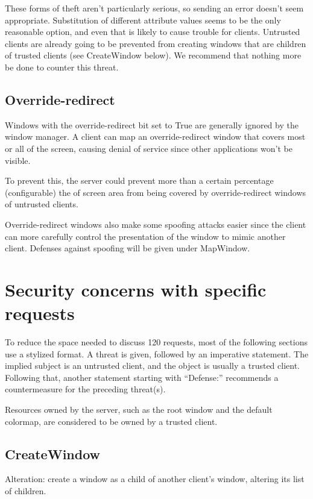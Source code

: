 \documentclass{article}
\begin{document}
These forms of theft aren't particularly serious, so sending an error
doesn't seem appropriate.  Substitution of different attribute values
seems to be the only reasonable option, and even that is likely to
cause trouble for clients.  Untrusted clients are already going to be
prevented from creating windows that are children of trusted clients
(see CreateWindow below).  We recommend that nothing more be done to
counter this threat.


\subsection{Override-redirect}

Windows with the override-redirect bit set to True are generally
ignored by the window manager.  A client can map an override-redirect
window that covers most or all of the screen, causing denial of
service since other applications won't be visible.

To prevent this, the server could prevent more than a certain
percentage (configurable) the of screen area from being covered by
override-redirect windows of untrusted clients.

Override-redirect windows also make some spoofing attacks easier since
the client can more carefully control the presentation of the window
to mimic another client.  Defenses against spoofing will be
given under MapWindow.

\section{Security concerns with specific requests}

To reduce the space needed to discuss 120 requests, most of the
following sections use a stylized format.  A threat is given, followed
by an imperative statement.  The implied subject is an untrusted
client, and the object is usually a trusted client.  Following that,
another statement starting with ``Defense:'' recommends a
countermeasure for the preceding threat(s).

Resources owned by the server, such as the root window and the default
colormap, are considered to be owned by a trusted client.


\subsection{CreateWindow}

Alteration: create a window as a child of another client's window,
altering its list of children.
\end{document}
